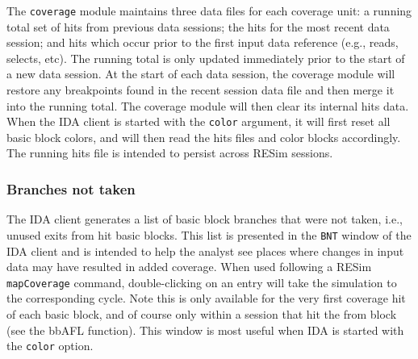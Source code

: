 \documentclass[titlepage]{article}
\begin{document}
The {\tt coverage} module maintains three data files for each coverage unit: a running total set of hits from previous data sessions; the hits for the most recent data session;
and hits which occur prior to the first input data reference (e.g., reads, selects, etc).  The running total is only updated immediately prior to the start 
of a new data session.  At the start of each data session, the coverage module will restore any breakpoints found
in the recent session data file and then merge it into the running total.  The coverage module will then clear its internal hits data.  
When the IDA client is started with the {\tt color} argument, it will first
reset all basic block colors,  and will then read the hits files and color blocks accordingly.  The running hits file is intended to persist across
RESim sessions.  


\subsubsection{Branches not taken}
\label{BNT}
The IDA client generates a list of basic block branches that were not taken, i.e., unused exits from hit basic blocks.  This list is presented in the {\tt BNT} window of the IDA client
and is intended to help the analyst see places where changes in input data may have resulted in added coverage.  When used following a
RESim {\tt mapCoverage} command, double-clicking on an entry will take the simulation to the corresponding 
cycle.  Note this is only available for the very first coverage hit of each basic block, and of course only within a session that hit the from block (see the bbAFL function).  This window is most useful when IDA is started with the {\tt color} option.
\end{document}
